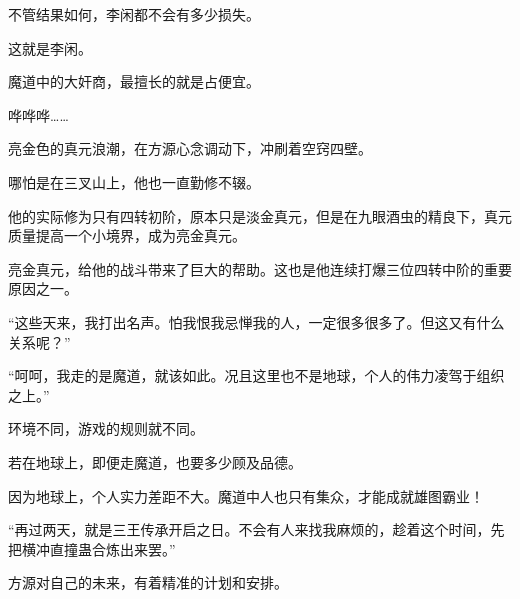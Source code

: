 \begin{this_body}
不管结果如何，李闲都不会有多少损失。

这就是李闲。

魔道中的大奸商，最擅长的就是占便宜。

哗哗哗……

亮金色的真元浪潮，在方源心念调动下，冲刷着空窍四壁。

哪怕是在三叉山上，他也一直勤修不辍。

他的实际修为只有四转初阶，原本只是淡金真元，但是在九眼酒虫的精良下，真元质量提高一个小境界，成为亮金真元。

亮金真元，给他的战斗带来了巨大的帮助。这也是他连续打爆三位四转中阶的重要原因之一。

“这些天来，我打出名声。怕我恨我忌惮我的人，一定很多很多了。但这又有什么关系呢？”

“呵呵，我走的是魔道，就该如此。况且这里也不是地球，个人的伟力凌驾于组织之上。”

环境不同，游戏的规则就不同。

若在地球上，即便走魔道，也要多少顾及品德。

因为地球上，个人实力差距不大。魔道中人也只有集众，才能成就雄图霸业！

“再过两天，就是三王传承开启之日。不会有人来找我麻烦的，趁着这个时间，先把横冲直撞蛊合炼出来罢。”

方源对自己的未来，有着精准的计划和安排。

\end{this_body}

